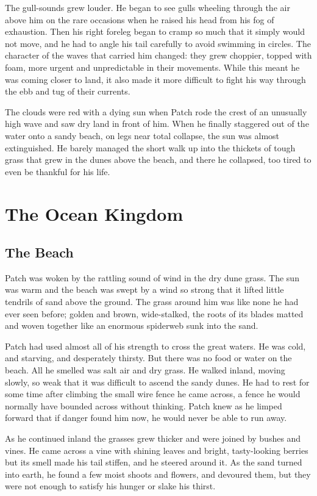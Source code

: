 \documentclass[12pt]{book}
\begin{document}
The gull-sounds grew louder. He began to see gulls wheeling through the air above him on the rare occasions when he raised his head from his fog of exhaustion. Then his right foreleg began to cramp so much that it simply would not move, and he had to angle his tail carefully to avoid swimming in circles. The character of the waves that carried him changed: they grew choppier, topped with foam, more urgent and unpredictable in their movements. While this meant he was coming closer to land, it also made it more difficult to fight his way through the ebb and tug of their currents.

The clouds were red with a dying sun when Patch rode the crest of an unusually high wave and saw dry land in front of him. When he finally staggered out of the water onto a sandy beach, on legs near total collapse, the sun was almost extinguished. He barely managed the short walk up into the thickets of tough grass that grew in the dunes above the beach, and there he collapsed, too tired to even be thankful for his life.


\chapter{The Ocean Kingdom}

\section{The Beach}

Patch was woken by the rattling sound of wind in the dry dune grass. The sun was warm and the beach was swept by a wind so strong that it lifted little tendrils of sand above the ground. The grass around him was like none he had ever seen before; golden and brown, wide-stalked, the roots of its blades matted and woven together like an enormous spiderweb sunk into the sand.

Patch had used almost all of his strength to cross the great waters. He was cold, and starving, and desperately thirsty. But there was no food or water on the beach. All he smelled was salt air and dry grass. He walked inland, moving slowly, so weak that it was difficult to ascend the sandy dunes. He had to rest for some time after climbing the small wire fence he came across, a fence he would normally have bounded across without thinking. Patch knew as he limped forward that if danger found him now, he would never be able to run away.

As he continued inland the grasses grew thicker and were joined by bushes and vines. He came across a vine with shining leaves and bright, tasty-looking berries %
but its smell made his tail stiffen, and he steered around it. As the sand turned into earth, he found a few moist shoots and flowers, and devoured them, but they were not enough to satisfy his hunger or slake his thirst.
\end{document}
